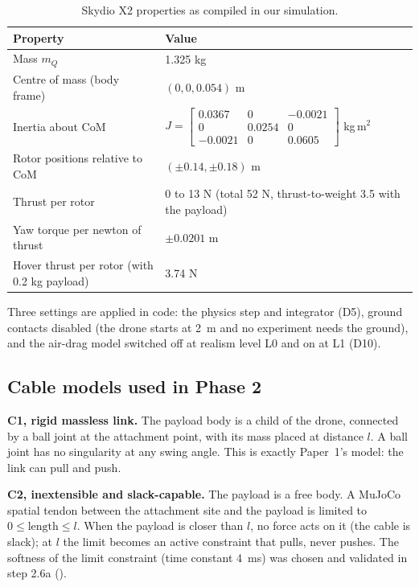 \documentclass[11pt,a4paper]{article}
\begin{document}
\begin{table}[htbp]
\centering\small
\begin{tabular}{@{}ll@{}}
\toprule
Property & Value \\
\midrule
Mass $m_Q$ & 1.325 kg \\
Centre of mass (body frame) & $(0, 0, 0.054)$ m \\
Inertia about CoM & $J = \begin{bmatrix}0.0367 & 0 & -0.0021\\ 0 & 0.0254 & 0\\ -0.0021 & 0 & 0.0605\end{bmatrix}$ kg\,m$^2$ \\
Rotor positions relative to CoM & $(\pm 0.14, \pm 0.18)$ m \\
Thrust per rotor & 0 to 13 N (total 52 N, thrust-to-weight 3.5 with the payload) \\
Yaw torque per newton of thrust & $\pm 0.0201$ m \\
Hover thrust per rotor (with 0.2 kg payload) & 3.74 N \\
\bottomrule
\end{tabular}
\caption{Skydio X2 properties as compiled in our simulation.}
\label{tab:x2}
\end{table}

Three settings are applied in code: the physics step and integrator (D5), ground contacts disabled (the drone starts at
2~m and no experiment needs the ground), and the air-drag model switched off at realism level L0 and on at L1 (D10).

\subsection{Cable models used in Phase 2}
\textbf{C1, rigid massless link.} The payload body is a child of the drone, connected by a ball joint at the attachment
point, with its mass placed at distance $l$. A ball joint has no singularity at any swing angle. This is exactly Paper~1's
model: the link can pull and push.

\textbf{C2, inextensible and slack-capable.} The payload is a free body. A MuJoCo spatial tendon between the attachment
site and the payload is limited to $0 \le \text{length} \le l$. When the payload is closer than $l$, no force acts on it
(the cable is slack); at $l$ the limit becomes an active constraint that pulls, never pushes. The softness of the limit
constraint (time constant 4~ms) was chosen and validated in step 2.6a ().
\end{document}
